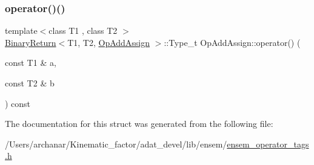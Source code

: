 \mbox{\label{structOpAddAssign_a804d22e657d15e33feee3d78d8d9f2a4}} 
\subsubsection{\texorpdfstring{operator()()}{operator()()}\hspace{0.1cm}{\footnotesize\ttfamily [2/2]}}
{\footnotesize\ttfamily template$<$class T1 , class T2 $>$ \\
\mbox{\hyperlink{structBinaryReturn}{Binary\+Return}}$<$T1, T2, \mbox{\hyperlink{structOpAddAssign}{Op\+Add\+Assign}} $>$\+::Type\+\_\+t Op\+Add\+Assign\+::operator() (\begin{DoxyParamCaption}\item[{const T1 \&}]{a,  }\item[{const T2 \&}]{b }\end{DoxyParamCaption}) const\hspace{0.3cm}{\ttfamily [inline]}}



The documentation for this struct was generated from the following file\+:\begin{DoxyCompactItemize}
\item 
/\+Users/archanar/\+Kinematic\+\_\+factor/adat\+\_\+devel/lib/ensem/\mbox{\hyperlink{lib_2ensem_2ensem__operator__tags_8h}{ensem\+\_\+operator\+\_\+tags.\+h}}\end{DoxyCompactItemize}
